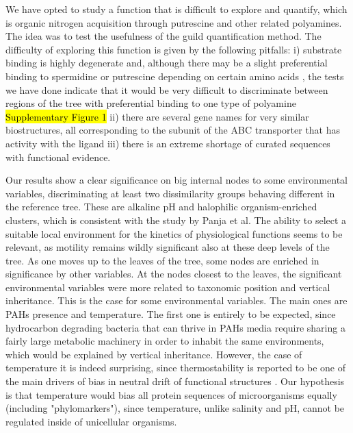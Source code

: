 \documentclass[Journal,letterpaper,NoLists]{ascelike-new}
\begin{document}
We have opted to study a function that is difficult to explore and quantify, which is organic nitrogen acquisition through putrescine and other related polyamines. The idea was to test the usefulness of the guild quantification method. The difficulty of exploring this function is given by the following pitfalls: i) substrate binding is highly degenerate and, although there may be a slight preferential binding to spermidine or putrescine depending on certain amino acids \cite{kashiwagi1996spermidine}, the tests we have done indicate that it would be very difficult to discriminate between regions of the tree with preferential binding to one type of polyamine \hl{Supplementary Figure 1}  ii) there are several gene names for very similar biostructures, all corresponding to the subunit of the ABC transporter that has activity with the ligand iii) there is an extreme shortage of curated sequences with functional evidence. 

Our results show a clear significance on big internal nodes to some environmental variables, discriminating at least two dissimilarity groups behaving different in the reference tree. These are alkaline pH and halophilic organism-enriched clusters, which is consistent with the study by Panja et al. The ability to select a suitable local environment for the kinetics of physiological functions seems to be relevant, as motility remains wildly significant also at these deep levels of the tree. As one moves up to the leaves of the tree, some nodes are enriched in significance by other variables. At the nodes closest to the leaves, the significant environmental variables were more related to taxonomic position and vertical inheritance. This is the case for some environmental variables. The main ones are PAHs presence and temperature. The first one is entirely to be expected, since hydrocarbon degrading bacteria that can thrive in PAHs media require sharing a fairly large metabolic machinery in order to inhabit the same environments, which would be explained by vertical inheritance. However, the case of temperature it is indeed surprising, since thermostability is reported to be one of the main drivers of bias in neutral drift of functional structures \cite{somero1995proteins,panja2020protein}. Our hypothesis is that temperature would bias all protein sequences of microorganisms equally (including "phylomarkers"), since temperature, unlike salinity and pH, cannot be regulated inside of unicellular organisms.
\end{document}
